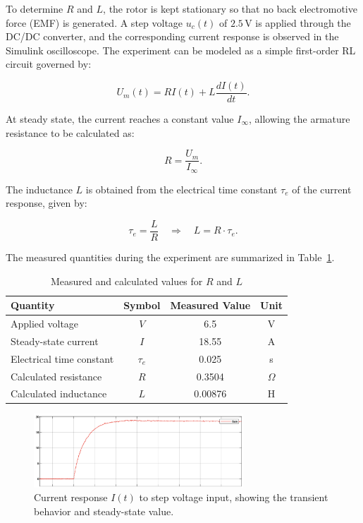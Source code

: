 \documentclass{rapportCS}
\begin{document}
To determine $R$ and $L$, the rotor is kept stationary so that no back electromotive force (EMF) is generated. A step voltage $u_c(t)$ of $2.5\,\mathrm{V}$ is applied through the DC/DC converter, and the corresponding current response is observed in the Simulink oscilloscope. The experiment can be modeled as a simple first-order RL circuit governed by:

\[
U_m(t) = R I(t) + L \frac{dI(t)}{dt}.
\]

At steady state, the current reaches a constant value $I_\infty$, allowing the armature resistance to be calculated as:

\[
R = \frac{U_m}{I_\infty}.
\]

The inductance $L$ is obtained from the electrical time constant $\tau_e$ of the current response, given by:

\[
\tau_e = \frac{L}{R} \quad \Longrightarrow \quad L = R \cdot \tau_e.
\]

The measured quantities during the experiment are summarized in Table~\ref{tab:RLvalues}.

\begin{table}[H]
\centering
\caption{Measured and calculated values for $R$ and $L$}
\label{tab:RLvalues}
\begin{tabular}{lccc}
\toprule
\textbf{Quantity} & \textbf{Symbol} & \textbf{Measured Value} & \textbf{Unit} \\
\midrule
Applied voltage & $V$ & 6.5 & V \\
Steady-state current & $I$ & 18.55 & A \\
Electrical time constant & $\tau_e$ & 0.025 & s \\
\midrule
Calculated resistance & $R$ & 0.3504 & $\Omega$ \\
Calculated inductance & $L$ & 0.00876 & H \\
\bottomrule
\end{tabular}
\end{table}

\begin{figure}[H]
\centering
\includegraphics[width=0.7\textwidth]{figures/graph_i_time.png}
\caption{Current response $I(t)$ to step voltage input, showing the transient behavior and steady-state value.}
\label{fig:i_time}
\end{figure}
\end{document}
